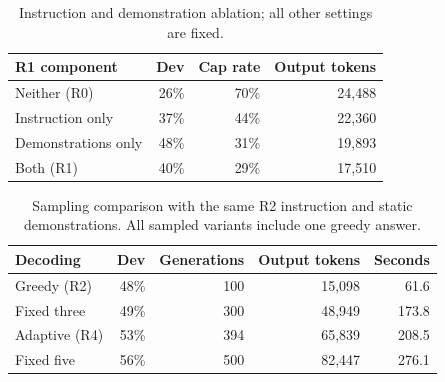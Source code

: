 \begin{table}[H]\centering\small
\begin{tabular}{lrrr}
\toprule R1 component & Dev & Cap rate & Output tokens \\
\midrule
Neither (R0) & 26\% & 70\% & 24,488 \\
Instruction only & 37\% & 44\% & 22,360 \\
Demonstrations only & 48\% & 31\% & 19,893 \\
Both (R1) & 40\% & 29\% & 17,510 \\
\bottomrule\end{tabular}
\caption{Instruction and demonstration ablation; all other settings are fixed.}
\end{table}
\begin{table}[H]\centering\small
\begin{tabular}{lrrrr}
\toprule Decoding & Dev & Generations & Output tokens & Seconds \\
\midrule
Greedy (R2) & 48\% & 100 & 15,098 & 61.6 \\
Fixed three & 49\% & 300 & 48,949 & 173.8 \\
Adaptive (R4) & 53\% & 394 & 65,839 & 208.5 \\
Fixed five & 56\% & 500 & 82,447 & 276.1 \\
\bottomrule\end{tabular}
\caption{Sampling comparison with the same R2 instruction and static demonstrations. All sampled variants include one greedy answer.}
\end{table}